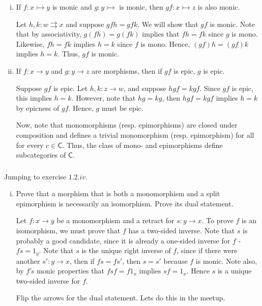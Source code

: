 \documentclass[10pt, oneside]{article}   	%
\newcommand{\cat}[1]{\bm{ \mathsf{#1} }}
\newcommand{\cc}{\cat{C}}
\newcommand{\mono}{\rightarrowtail}
\begin{document}
\begin{enumerate}[(i)]

\item If $f : x \mono y$ is monic and $g : y \mono$ is monic, then $gf : x \mono z$ is also monic.

Let $h,k : w \rightrightarrows x$ and suppose $gfh = gfk$. We will show that $gf$ is monic. Note that by associativity, $g(fh) = g(fk)$ implies that $fh = fk$ since $g$ is mono. Likewise, $fh = fk$ implies $h = k$ since $f$ is mono. Hence, $(gf)h = (gf)k$ implies $h = k$. Thus, $gf$ is monic. 

\item If $f : x \to y$ and $g : y \to z$ are morphisms, then if $gf$ is epic, $g$ is epic. 

Suppose $gf$ is epic. Let $h, k : z \to w$, and suppose $hgf = kgf$. Since $gf$ is epic, this implies $h = k$. However, note that $hg = kg$, then $hgf = kgf$ implies $h = k$ by epicness of $gf$. Hence, $g$ must be epic.

Now, note that monomorphisms (resp. epimorphisms) are closed under composition and defines a trivial monomorphism (resp. epimorphism) for all for every $c \in \cc$. Thus, the class of mono- and epimorphisms define subcategories of $\cc$.
\end{enumerate}

\subsubsection{}

Jumping to exercise $1.2.iv$. 

\begin{enumerate}[(i)]

\item Prove that a morphism that is both a monomorphism and a split epimorphism is necessarily an isomorphism. Prove its dual statement. 

Let $f: x \to y$ be a monomorphism and a retract for $s : y \to x$. To prove $f$ is an isomorphism, we must prove that $f$ has a two-sided inverse. Note that $s$ is probably a good candidate, since it is already a one-sided inverse for $f$ - $fs = 1_y$. Note that $s$ is the unique right inverse of $f$, since if there were another $s' : y \to x$, then if $fs = fs'$, then $s = s'$ because $f$ is monic. Note also, by $f$'s monic properties that $fsf = f1_x$ implies $sf = 1_x$. Hence $s$ is a unique two-sided inverse for $f$. 

Flip the arrows for the dual statement. Lets do this in the meetup. 
\end{enumerate}
\end{document}
